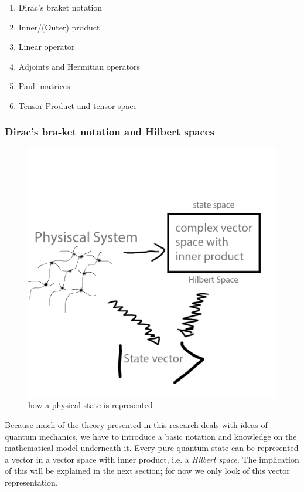 	\begin{enumerate}
	\item Dirac's braket notation
	\item Inner/(Outer) product
	\item Linear operator
	\item Adjoints and Hermitian operators
	\item Pauli matrices
	\item Tensor Product and tensor space
	\end{enumerate}
	
	\subsubsection*{Dirac's bra-ket notation and Hilbert spaces}
	\begin{figure}[h!]
		\centering
		\includegraphics[scale=0.2]{images/sketch1.png} 
		\caption{how a physical state is represented}
	\end{figure}
	Because much of the theory presented in this research deals with ideas of quantum mechanics, we have to introduce a basic notation and knowledge on the mathematical model underneath it. 
	Every pure quantum state can be represented a vector in a vector space with inner product, i.e. a \emph{Hilbert space}. 
	The implication of this will be explained in the next section; for now we only look of this vector representation.\\
